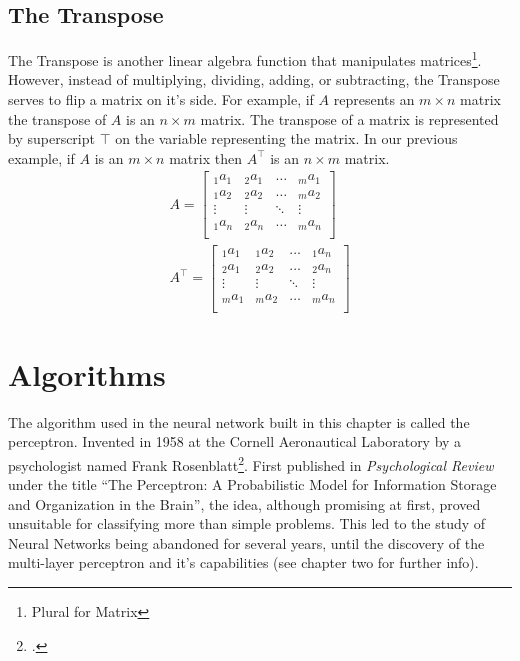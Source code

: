 \documentclass{memoir}
\begin{document}
\subsection{The Transpose}
The Transpose is another linear algebra function that manipulates matrices\footnote{Plural for Matrix}. However, instead of multiplying, dividing, adding, or subtracting, the Transpose serves to flip a matrix on it's side. For example, if $A$ represents an $m \times n$ matrix the transpose of $A$ is an $n \times m$ matrix. The transpose of a matrix is represented by superscript $\intercal$ on the variable representing the matrix. In our previous example, if $A$ is an $m \times n$ matrix then $A^\intercal$ is an $n \times m$ matrix.
\[
	\begin{align}
		A =
		\begin{bmatrix}
		_1a_1  & _2a_1  & \dots  & _ma_1  \\
		_1a_2  & _2a_2  & \dots  & _ma_2  \\
		\vdots & \vdots & \ddots & \vdots \\
		_1a_n  & _2a_n  & \dots  & _ma_n  \\
		\end{bmatrix} \\
		A^\intercal =
		\begin{bmatrix}
		_1a_1  & _1a_2  & \dots  & _1a_n  \\
		_2a_1  & _2a_2  & \dots  & _2a_n  \\
		\vdots & \vdots & \ddots & \vdots \\
		_ma_1  & _ma_2  & \dots  & _ma_n  \\
		\end{bmatrix}
	\end{align}\]
	\section{Algorithms}
	The algorithm used in the neural network built in this chapter is called the perceptron. Invented in 1958 at the Cornell Aeronautical Laboratory by a psychologist named Frank Rosenblatt\footcite{perceptronSrc}.
	First published in \emph{Psychological Review} under the title ``The Perceptron: A Probabilistic Model for Information Storage and Organization in the Brain'', the idea, although promising at first, proved unsuitable for classifying more than simple problems. This led to the study of Neural Networks being abandoned for several years, until the discovery of the multi-layer perceptron and it's capabilities (see chapter two for further info).
\end{document}
